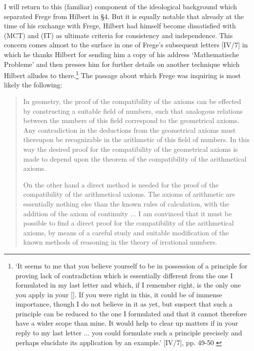 \documentclass[11pt,fleqn,leqno]{article}
\begin{document}
I will return to this (familiar) component of the ideological background which separated Frege from Hilbert in \S 4.  But it is equally notable that already at the time of his exchange with Frege, Hilbert had himself become dissatisfied with (MCT) and (IT) as ultimate criteria for consistency and independence.   This concern comes almost to the surface in one of Frege's subsequent letters [IV/7] in which he thanks Hilbert for sending him a copy of his address `Mathematische Probleme' \citeyearpar{Hilbert1900} and then presses him for further details on another technique which Hilbert alludes to there.\footnote{`It seems to me that you believe yourself to be in possession of a principle for proving lack of contradiction which is essentially different from the one I formulated in my last letter and which, if I remember right, is the only one you apply in your [\citeyear{Hilbert1899}].  If you were right in this, it could be of immense importance, though I do not believe in it as yet, but suspect that such a principle can be reduced to the one I formulated and that it cannot therefore have a wider scope than mine. It would help to clear up matters if in your reply to my last letter $\ldots$ you could formulate such a principle precisely and perhaps elucidate its application by an example.' [IV/7], pp. 49-50 \label{fnote1}}  The passage about which Frege was inquiring is most likely the following:

{\footnotesize
\begin{quote}
In geometry, the proof of the compatibility of the axioms can be effected by constructing a suitable field of numbers, such that analogous relations between the numbers of this field correspond to the geometrical axioms. Any contradiction in the deductions from the geometrical axioms must thereupon be recognizable in the arithmetic of this field of numbers. In this way the desired proof for the compatibility of the geometrical axioms is made to depend upon the theorem of the compatibility of the arithmetical axioms. 

On the other hand a direct method is needed for the proof of the compatibility of the arithmetical axioms. The axioms of arithmetic are essentially nothing else than the known rules of calculation, with the addition of the axiom of continuity $\ldots$ I am convinced that it must be possible to find a direct proof for the compatibility of the arithmetical axioms, by means of a careful study and suitable modification of the known methods of reasoning in the theory of irrational numbers. \hfill \citeyearpar[p. 1104]{Hilbert1900}
\end{quote}
}
\end{document}
